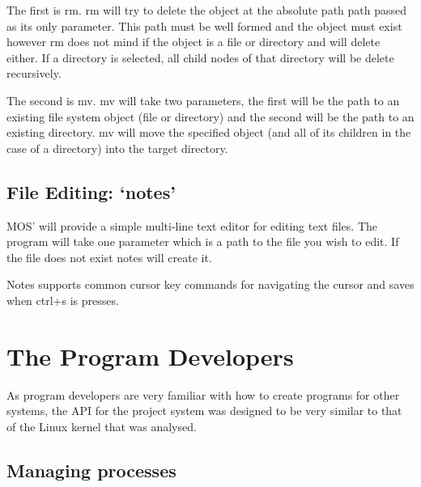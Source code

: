 \documentclass[a4paper]{report}
\begin{document}
The first is rm. rm will try to delete the object at the absolute path path passed as its only parameter. This path must be well formed and the object must exist however rm does not mind if the object is a file or directory and will delete either. If a directory is selected, all child nodes of that directory will be delete recursively.

The second is mv. mv will take two parameters, the first will be the path to an existing file system object (file or directory) and the second will be the path to an existing directory. mv will move the specified object (and all of its children in the case of a directory) into the target directory.

\subsection{File Editing: `notes'}

MOS' will provide a simple multi-line text editor for editing text files. The program will take one parameter which is a path to the file you wish to edit. If the file does not exist notes will create it.

Notes supports common cursor key commands for navigating the cursor and saves when ctrl+s is presses.































\section{The Program Developers}

As program developers are very familiar with how to create programs for other systems, the API for the project system was designed to be very similar to that of the Linux kernel that was analysed.

\subsection{Managing processes}
\end{document}
